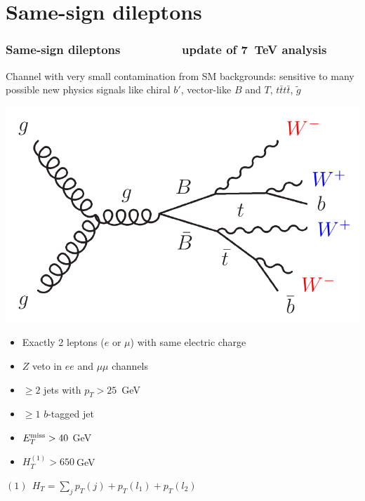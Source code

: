 \documentclass[xcolor=dvipsnames,10pt]{beamer}
\begin{document}
\section{Same-sign dileptons}
\begin{frame}\frametitle{Same-sign dileptons~\cite{ATLAS-CONF-2013-051} \small $\qquad\qquad$ update of 7~TeV analysis~\cite{ATLAS-CONF-2012-130}}
\footnotesize\centering

Channel with very small contamination from SM backgrounds: sensitive to many possible new physics signals like chiral $b'$, vector-like $B$ and $T$, $t\bar{t}t\bar{t}$, $\tilde{g}$

\scriptsize
\begin{minipage}{.32\textwidth}\centering
\includegraphics[width=1.\textwidth]{ssign/feynss}
  \end{minipage}\begin{minipage}{.24\textwidth}
       \begin{itemize}
       \item Exactly 2 leptons ($e$ or $\mu$) with same electric charge
       \item $Z$ veto in $ee$ and $\mu\mu$ channels
       \end{itemize}
     \end{minipage}\begin{minipage}{.22\textwidth}
       \begin{itemize}
       \item $\geq 2$ jets with $p_T>25$~GeV
       \item $\geq 1$ $b$-tagged jet 
       \end{itemize} 
     \end{minipage}\begin{minipage}{.22\textwidth}
       \begin{itemize}
       \item ${E}^{\rm miss}_T > 40~$GeV
       \item $H_T^{(1)}> 650~$GeV
       \end{itemize} 
  \end{minipage}
         


\tiny
\begin{flushright}
$(1)\ \ H_T=\sum_j p_T(j) + p_T(l_1) + p_T(l_2)$
\end{flushright}

\end{frame}
\end{document}
